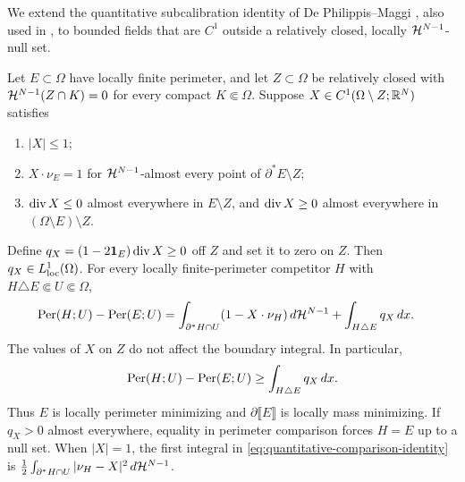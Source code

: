We extend the quantitative subcalibration identity of De Philippis--Maggi
\cite[Proposition~4.1, equation~(4.5)]{DePhilippisMaggi14}, also used in
\cite[Section~2, equation~(3)]{Liu19}, to bounded fields that are \(C^1\)
outside a relatively closed, locally \(\mathcal H^{N-1}\)-null set.

\begin{theorem}
\label{thm:removable-subcalibration}
Let \(E\subset\Omega\) have locally finite perimeter, and let
\(Z\subset\Omega\) be relatively closed with
\(\mathcal H^{N-1}(Z\cap K)=0\) for every compact \(K\Subset\Omega\).
Suppose
\(X\in C^1(\Omega\setminus Z;\mathbb R^N)\) satisfies
\begin{enumerate}[label=\textup{(\roman*)}]
 \item \(|X|\leq1\);
 \item \(X\cdot\nu_E=1\) for \(\mathcal H^{N-1}\)-almost every point of
 \(\partial^*E\setminus Z\);
 \item \(\operatorname{div} X\leq0\) almost everywhere in \(E\setminus Z\), and
 \(\operatorname{div} X\geq0\) almost everywhere in \((\Omega\setminus E)\setminus Z\).
\end{enumerate}
Define \(q_X=(1-2\mathbf 1_E)\operatorname{div} X\geq0\) off \(Z\) and set it to zero on
\(Z\).  Then \(q_X\in L^1_{\rm loc}(\Omega)\).  For every
locally finite-perimeter competitor \(H\) with \(H\triangle E\Subset U\Subset\Omega\),
\begin{align}
 \operatorname{Per}(H;U)-\operatorname{Per}(E;U)
 &=\int_{\partial^*H\cap U}(1-X\cdot\nu_H)\,d\mathcal H^{N-1}
   +\int_{H\triangle E}q_X\,dx.\label{eq:quantitative-comparison-identity}
\end{align}
The values of \(X\) on \(Z\) do not affect the boundary integral.
In particular,
\begin{equation}\label{eq:quantitative-comparison}
 \operatorname{Per}(H;U)-\operatorname{Per}(E;U)\geq\int_{H\triangle E}q_X\,dx.
\end{equation}
Thus \(E\) is locally perimeter minimizing and
\(\partial\llbracket E\rrbracket\) is locally mass minimizing.
If \(q_X>0\) almost everywhere, equality in perimeter comparison forces
\(H=E\) up to a null set.  When \(|X|=1\), the first integral in
\eqref{eq:quantitative-comparison-identity} is
\(\frac12\int_{\partial^*H\cap U}|\nu_H-X|^2\,d\mathcal H^{N-1}\).
\end{theorem}

